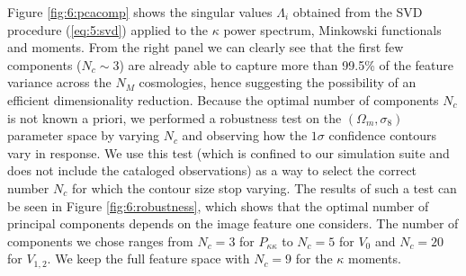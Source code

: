 Figure \ref{fig:6:pcacomp} shows the singular values $\Lambda_i$ obtained from the SVD procedure (\ref{eq:5:svd}) applied to the $\kappa$ power spectrum, Minkowski functionals and moments. From the right panel we can clearly see that the first few components ($N_c\sim 3$) are already able to capture more than 99.5\% of the feature variance across the $N_M$ cosmologies, hence suggesting the possibility of an efficient dimensionality reduction. Because the optimal number of components $N_c$ is not known a priori, we performed a robustness test on the $(\Omega_m,\sigma_8)$ parameter space by varying $N_c$ and observing how the $1\sigma$ confidence contours vary in response. We use this test (which is confined to our simulation suite and does not include the cataloged observations) as a way to select the correct number $N_c$ for which the contour size stop varying. The results of such a test can be seen in Figure \ref{fig:6:robustness}, which shows that the optimal number of principal components depends on the image feature one considers. The number of components we chose ranges from $N_c=3$ for $P_{\kappa\kappa}$ to $N_c=5$ for $V_0$ and $N_c=20$ for $V_{1,2}$. We keep the full feature space with $N_c=9$ for the $\kappa$ moments. 

